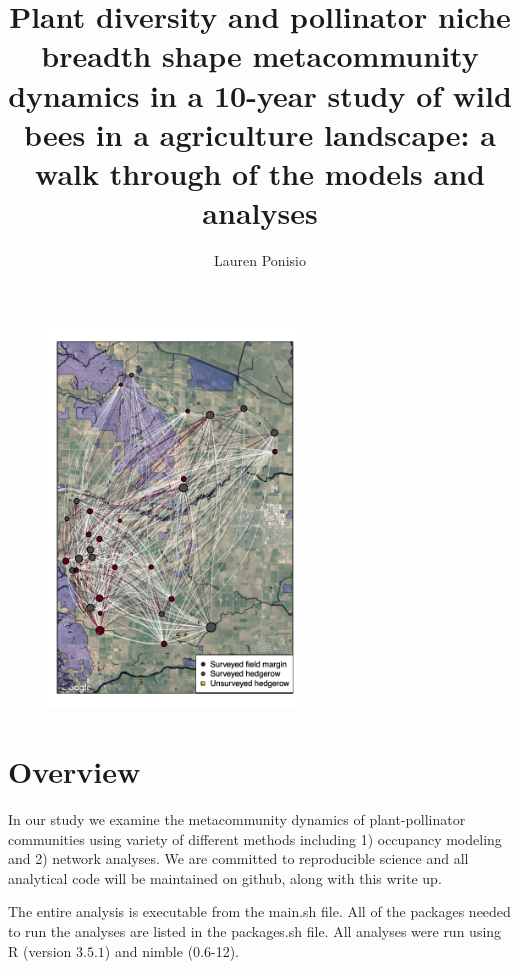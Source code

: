 \documentclass{article}\usepackage[]{graphicx}\usepackage[]{color}
\begin{document}
\title{Plant diversity and pollinator niche breadth shape
  metacommunity dynamics in a 10-year study of wild bees in a
  agriculture landscape: a walk through of the models and analyses}
\author{Lauren Ponisio}


\maketitle

\begin{figure}[h!]
  \centering
  \includegraphics[width=0.6\textwidth]{figure/degree_spatial.pdf}
  \label{fig:network}
\end{figure}
\clearpage

\section{Overview}
In our study we examine the metacommunity dynamics of plant-pollinator
communities using variety of different methods including 1) occupancy
modeling and 2) network analyses.  We are committed to reproducible
science and all analytical code will be maintained on github, along
with this write up.

The entire analysis is executable from the main.sh file. All of the
packages needed to run the analyses are listed in the packages.sh
file. All analyses were run using R (version $3.5.1$)
and nimble (0.6-12). 
\end{document}
